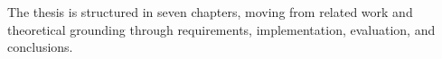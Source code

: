 \documentclass[12pt]{report}
\begin{document}
The thesis is structured in seven chapters, moving from related work and theoretical grounding through requirements, implementation, evaluation, and conclusions.





\tableofcontents


\newpage
{}











\end{document}
